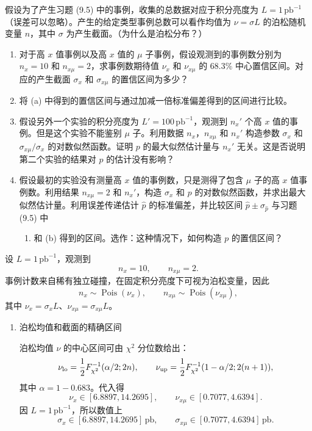\begin{question}
假设为了产生习题 (9.5) 中的事例，收集的总数据对应于积分亮度为
\(L=1\,\mathrm{pb}^{-1}\)（误差可以忽略）。产生的给定类型事例总数可以看作均值为
\(\nu=\sigma L\) 的泊松随机变量 \(n\)，其中 \(\sigma\)
为产生截面。（为什么是泊松分布？）

\begin{enumerate}
\item
  对于高 \(x\) 值事例以及高 \(x\) 值的 \(\mu\)
  子事例，假设观测到的事例数分别为 \(n_x=10\) 和
  \(n_{x\mu}=2\)，求事例数期待值 \(\nu_x\) 和 \(\nu_{x\mu}\) 的 68.3\%
  中心置信区间。对应的产生截面 \(\sigma_x\) 和 \(\sigma_{x\mu}\)
  的置信区间为多少？
\item
  将 (a) 中得到的置信区间与通过加减一倍标准偏差得到的区间进行比较。
\item
  假设另外一个实验的积分亮度为 \(L'=100\,\mathrm{pb}^{-1}\)，观测到
  \(n_x'\) 个高 \(x\) 值的事例。但是这个实验不能鉴别 \(\mu\)
  子。利用数据 \(n_x\)，\(n_{x\mu}\) 和 \(n_x'\) 构造参数 \(\sigma_x\)
  和 \(\sigma_{x\mu}/\sigma_x\) 的对数似然函数。证明 \(p\)
  的最大似然估计量与 \(n_x'\) 无关。这是否说明第二个实验的结果对 \(p\)
  的估计没有影响？
\item
  假设最初的实验没有测量高 \(x\) 值的事例数，只是测得了包含 \(\mu\)
  子的高 \(x\) 值事例数。利用结果 \(n_{x\mu}=2\) 和 \(n_x'\)，构造
  \(\sigma_x\) 和 \(p\)
  的对数似然函数，并求出最大似然估计量。利用误差传递估计 \(\hat p\)
  的标准偏差，并比较区间 \(\hat p\pm\sigma_{\hat p}\) 与习题 (9.5) 中
\begin{enumerate}
\item 和 (b) 得到的区间。选作：这种情况下，如何构造 \(p\) 的置信区间？
\end{enumerate}
\end{enumerate}
\begin{solution}
设 \(L=1\,\mathrm{pb}^{-1}\)，观测到
\[
n_x=10,
\qquad
n_{x\mu}=2.
\]
事例计数来自稀有独立碰撞，在固定积分亮度下可视为泊松变量，因此
\[
n_x\sim\operatorname{Pois}(\nu_x),
\qquad
n_{x\mu}\sim\operatorname{Pois}(\nu_{x\mu}),
\]
其中 \(\nu_x=\sigma_xL\)、\(\nu_{x\mu}=\sigma_{x\mu}L\)。

\begin{enumerate}
\item 泊松均值和截面的精确区间

泊松均值 \(\nu\) 的中心区间可由 \(\chi^2\) 分位数给出：
\[
\nu_{\rm lo}=\frac12F_{\chi^2}^{-1}(\alpha/2;2n),
\qquad
\nu_{\rm up}=\frac12F_{\chi^2}^{-1}(1-\alpha/2;2(n+1)),
\]
其中 \(\alpha=1-0.683\)。代入得
\[
\nu_x\in[6.8897,14.2695],
\qquad
\nu_{x\mu}\in[0.7077,4.6394].
\]
因 \(L=1\,\mathrm{pb}^{-1}\)，所以数值上
\[
\sigma_x\in[6.8897,14.2695]\,\mathrm{pb},
\qquad
\sigma_{x\mu}\in[0.7077,4.6394]\,\mathrm{pb}.
\]


\end{enumerate}
\end{solution}
\end{question}
